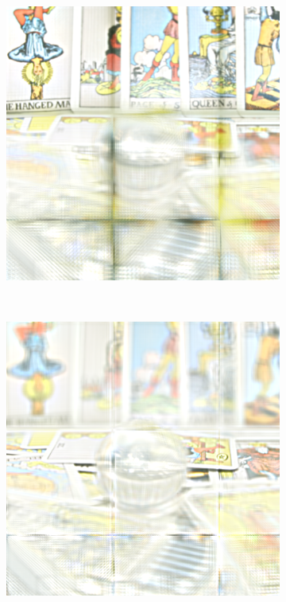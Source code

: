 \documentclass[11pt,a4paper,titlepage]{article}
\begin{document}
\begin{figure}
	\centering
	\begin{subfigure}[t]{0.19\textwidth}
		\includegraphics[width=\textwidth]{results/tile_blending/tarot6x6x512x512-512x512x5-sampling=2x_tileRes=200x200_overlap=0/1.png}
	\end{subfigure}%
	~
	\begin{subfigure}[t]{0.19\textwidth}
		\includegraphics[width=\textwidth]{results/tile_blending/tarot6x6x512x512-512x512x5-sampling=2x_tileRes=200x200_overlap=0/2.png}

\end{subfigure}
\end{figure}
\end{document}
